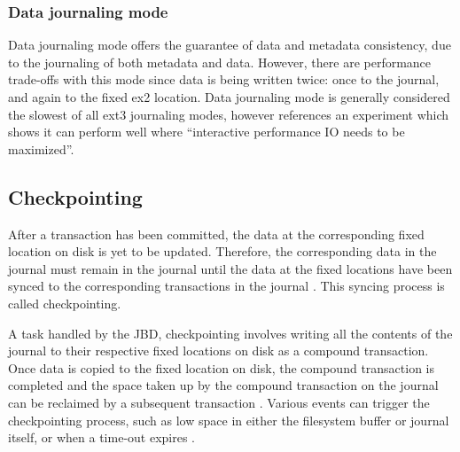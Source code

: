 \subsubsection{Data journaling mode}

Data journaling mode offers the guarantee of data and metadata consistency, due to the journaling of both metadata and data. However, there are performance trade-offs with this mode since data is being written twice: once to the journal, and again to the fixed ex2 location. Data journaling mode is generally considered the slowest of all ext3 journaling modes, however \citet[p. 3]{Robbins2001b} references an experiment which shows it can perform well where ``interactive performance IO needs to be maximized''.

\subsection{Checkpointing}

After a transaction has been committed, the data at the corresponding fixed location on disk is yet to be updated. Therefore, the corresponding data in the journal must remain in the journal until the data at the fixed locations have been synced to the corresponding transactions in the journal \citep{Tweedie1998}. This syncing process is called checkpointing.

A task handled by the JBD, checkpointing involves writing all the contents of the journal to their respective fixed locations on disk as a compound transaction. Once data is copied to the fixed location on disk, the compound transaction is completed and the space taken up by the compound transaction on the journal can be reclaimed by a subsequent transaction \citep{Tweedie2000, Tweedie1998, Prabhakaran2005a, Katiyar2011, Devlisden2011}. Various events can trigger the checkpointing process, such as low space in either the filesystem buffer or journal itself, or when a time-out expires \citep{Prabhakaran2005a}.



